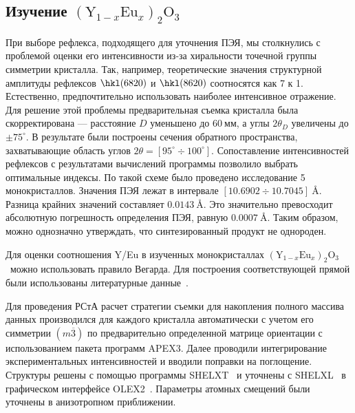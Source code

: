 \documentclass[a4paper,14pt]{extarticle}
\newcommand{\unit}[1]{ \ \text{#1}}
\newcommand{\degree}{^\circ}
\newcommand{\YEu}{${(\text{Y}_{1-x}\text{Eu}_x)}_2\text{O}_3$}
\newcommand{\range}[2]{[#1\div#2]}
\begin{document}
\subsection{Изучение \YEu}
При выборе рефлекса, подходящего для уточнения ПЭЯ, мы столкнулись с проблемой оценки его интенсивности из-за хиральности точечной группы симметрии кристалла.
Так, например, теоретические значения структурной амплитуды рефлексов $\hkl(6 8 20)$ и $\hkl(8 6 20)$ соотносятся как 7 к 1.
Естественно, предпочтительно использовать наиболее интенсивное отражение.
Для решение этой проблемы предварительная съемка кристалла была скорректирована --- расстояние $D$ уменьшено до $60\unit{мм}$, а углы $2\theta_D$ увеличены до $\pm 75\degree$.
В результате были построены сечения обратного пространства, захватывающие область углов $2\theta = \range{95\degree}{100\degree}$.
Сопоставление интенсивностей рефлексов с результатами вычислений программы позволило выбрать оптимальные индексы.
По такой схеме было проведено исследование 5 монокристаллов.
Значения ПЭЯ лежат в интервале $\range{10.6902}{10.7045}\unit{\AA}$.
Разница крайних значений составляет $0.0143\unit{\AA}$.
Это значительно превосходит абсолютную погрешность определения ПЭЯ, равную $0.0007\unit{\AA}$.
Таким образом, можно однозначно утверждать, что синтезированный продукт не однороден.

Для оценки соотношения Y/Eu в изученных монокристаллах \YEu~можно использовать правило Вегарда.
Для построения соответствующей прямой были использованы литературные данные~\cite{Swanson:1954,Morris:1984}.

Для проведения РСтА расчет стратегии съемки для накопления полного массива данных производился для каждого кристалла автоматически с учетом его симметрии $(m\overline{3})$ по предварительно определенной матрице ориентации с использованием пакета программ APEX3.
Далее проводили интегрирование экспериментальных интенсивностей и вводили поправки на поглощение.
Структуры решены с помощью программы SHELXT~\cite{Sheldrick:2015:shelxt} и уточнены с SHELXL~\cite{Sheldrick:2015:shelxl} в графическом интерфейсе OLEX2~\cite{Dolomanov:2009}.
Параметры атомных смещений были уточнены в анизотропном приближении.
\end{document}
